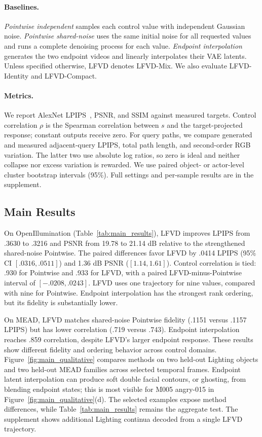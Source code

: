 \paragraph{Baselines.}
\emph{Pointwise independent} samples each control value with independent
Gaussian noise. \emph{Pointwise shared-noise} uses the same initial noise for
all requested values and runs a complete denoising process for each value.
\emph{Endpoint interpolation} generates the two endpoint videos and linearly
interpolates their VAE latents. Unless specified otherwise, LFVD denotes
LFVD-Mix. We also evaluate LFVD-Identity and LFVD-Compact.

\paragraph{Metrics.}
We report AlexNet LPIPS~\cite{zhang2018lpips}, PSNR, and SSIM against
measured targets. Control correlation $\rho$ is the Spearman correlation
between $s$ and the target-projected response; constant outputs receive zero.
For query paths, we compare generated and measured adjacent-query LPIPS,
total path length, and second-order RGB variation. The latter two use absolute
log ratios, so zero is ideal and neither collapse nor excess variation is
rewarded. We use paired object- or actor-level cluster bootstrap intervals
(95\%). Full settings and per-sample results are in the supplement.

\subsection{Main Results}



On OpenIllumination (Table~\ref{tab:main_results}), LFVD improves LPIPS
from .3630 to .3216 and PSNR from 19.78 to 21.14 dB relative to the
strengthened shared-noise Pointwise. The paired differences favor LFVD by
.0414 LPIPS (95\% CI $[.0316,.0511]$) and 1.36 dB PSNR
($[1.14,1.61]$). Control correlation is tied: .930 for Pointwise and .933
for LFVD, with a paired LFVD-minus-Pointwise interval of
$[-.0208,.0243]$. LFVD uses one trajectory for nine values, compared with
nine for Pointwise. Endpoint interpolation has the strongest rank ordering,
but its fidelity is substantially lower.

On MEAD, LFVD matches shared-noise Pointwise fidelity (.1151 versus .1157
LPIPS) but has lower correlation (.719 versus .743). Endpoint interpolation
reaches .859 correlation, despite LFVD's larger endpoint response. These
results show different fidelity and ordering behavior across control domains.
Figure~\ref{fig:main_qualitative} compares methods on two held-out Lighting
objects and two held-out MEAD families across selected temporal frames.
Endpoint latent interpolation can produce soft double facial contours, or
ghosting, from blending endpoint states; this is most visible for M005
angry-015 in Figure~\ref{fig:main_qualitative}(d). The selected examples expose
method differences, while Table~\ref{tab:main_results} remains the aggregate
test. The supplement shows additional Lighting continua decoded from a single
LFVD trajectory.

